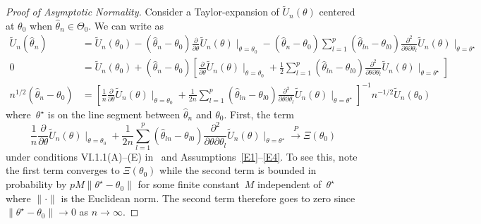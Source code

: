\documentclass[12pt]{amsart}
\begin{document}
\begin{proof}[Proof of Asymptotic Normality]
Consider a Taylor-expansion of $\tilde U_n (\theta)$ centered at $\theta_0$ when $\hat \theta_n \in \Theta_0$.  We can write as
\begin{align*}
\tilde U_n (\hat \theta_n) &= \tilde U_n (\theta_0) -  (\hat \theta_n - \theta_0) \frac{\partial}{\partial \theta} \tilde U_n (\theta) \mid_{\theta=\theta_0} - (\hat \theta_n - \theta_0) \sum_{l=1}^p (\hat \theta_{ln} - \theta_{l0}) \frac{\partial^2}{\partial \theta \partial \theta_l} \tilde U_n (\theta) \mid_{\theta=\theta^\star} \\
0 &= \tilde U_n (\theta_0) + (\hat \theta_n - \theta_0) \left[ \frac{\partial}{\partial \theta} \tilde U_n (\theta) \mid_{\theta=\theta_0} + \frac{1}{2} \sum_{l=1}^p (\hat \theta_{ln} - \theta_{l0}) \frac{\partial^2}{\partial \theta \partial \theta_l} \tilde U_n (\theta) \mid_{\theta=\theta^\star} \right] \\
n^{1/2} (\hat \theta_n - \theta_0) &= \left[ \frac{1}{n} \frac{\partial}{\partial \theta} \tilde U_n (\theta) \mid_{\theta=\theta_0} + \frac{1}{2n} \sum_{l=1}^p (\hat \theta_{ln} - \theta_{l0}) \frac{\partial^2}{\partial \theta \partial \theta_l} \tilde U_n (\theta) \mid_{\theta=\theta^\star} \right]^{-1} n^{-1/2} \tilde U_n (\theta_0)
\end{align*}
where~$\theta^\star$ is on the line segment between $\hat \theta_n$ and $\theta_0$. First, the term
$$
\frac{1}{n} \frac{\partial}{\partial \theta} \tilde U_n (\theta) \mid_{\theta=\theta_0} + \frac{1}{2n} \sum_{l=1}^p (\hat \theta_{ln} - \theta_{l0}) \frac{\partial^2}{\partial \theta \partial \theta_l} \tilde U_n (\theta) \mid_{\theta=\theta^\star}
\overset{P}{\to} \Xi(\theta_0)
$$
under conditions VI.1.1(A)--(E) in~\cite{Andersen1993} and Assumptions~\ref{E1}--\ref{E4}.  To see this, note the first term converges to $\Xi(\theta_0)$ while the second term is bounded in probability by $p M \| \theta^\star - \theta_0 \|$ for some finite constant~$M$ independent of~$\theta^\star$ where $\| \cdot \|$ is the Euclidean norm.  The second term therefore goes to zero since $\| \theta^\star - \theta_0 \| \to 0$ as $n \to \infty$.


\end{proof}
\end{document}
